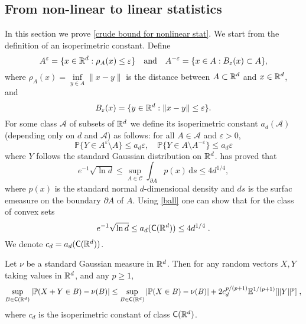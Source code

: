 \subsection{From non-linear to linear statistics}
\label{sec: from nonlinear to linear boot}
In this section we prove \eqref{crude bound for nonlinear stat}. We start from the definition of an isoperimetric constant.  
Define 
\[
A^{\varepsilon} = \{x \in \mathbb{R}^d : \rho_A(x) \leq \varepsilon\}
\quad \text{and} \quad
A^{-\varepsilon} = \{x \in A : B_{\varepsilon}(x) \subset A\},
\]
where $\rho_A(x) = \inf\limits_{y \in A} \|x - y\|$ is the distance between $A \subset \mathbb{R}^d$ and $x \in \mathbb{R}^d$, and 
\[
B_{\varepsilon}(x) = \{y \in \mathbb{R}^d : \|x - y\| \leq \varepsilon\}.
\]
For some class $\mathcal A$ of subsets of $\mathbb{R}^d$ we define its isoperimetric constant $a_d(\mathscr{A})$ (depending only on $d$ and $\mathscr{A}$)  as follows: for all $A \in \mathscr{A}$  and $\varepsilon > 0$,
\[
\mathbb{P} \{ Y \in A^{\varepsilon} \setminus A \} \leq a_d \varepsilon, \quad
\mathbb{P} \{ Y \in A \setminus A^{-\varepsilon} \} \leq a_d \varepsilon
\]
where  $Y$ follows the standard Gaussian distribution on $\mathbb{R}^d$. \citep{ball_reverse_1993} has proved that
\begin{equation}
\label{ball}
    e^{-1} \sqrt{\ln d} \leq \sup_{A \in \mathscr{C}} \int_{\partial A} p(x) \, \mathrm{d}s \leq 4 d^{1/4},
\end{equation}
where $p(x)$ is the standard normal $d$-dimensional density and $ds$ is the surfac emeasure on the boundary $\partial A$ of $A$. Using \eqref{ball} one can show that for the class of convex sets 
\begin{equation}
\label{eq: isoperimetric const convex}
    e^{-1} \sqrt{\ln d} \leq a_d(\mathsf{C}(\mathbb{R}^d)) \le   4 d^{1/4} \;. 
\end{equation}
We denote $c_d = a_d(\mathsf{C}(\mathbb{R}^d))$. 
\begin{proposition}
\label{nonlinearapprox}
Let $\nu$ be a standard Gaussian measure in $\mathbb{R}^d$. Then for any random vectors $X, Y$ taking values in $\mathbb{R}^d$, and any $p \geq 1$,
  \begin{equation}
\label{eq:shao_zhang_bound}
\sup_{B \in \mathsf{C}(\mathbb{R}^d)}|\mathbb{P}(X + Y \in B) - \nu(B)| \le \sup_{B \in \mathsf{C}(\mathbb{R}^d)}|\mathbb{P}(X
\in B) - \nu(B)| + 2 c_d^{p/(p+1)} \mathbb{E}^{1/(p+1)}[\|Y\|^p]\;, 
\end{equation}
where $c_d$ is the isoperimetric constant of class $\mathsf{C}(\mathbb{R}^d)$.
\end{proposition}
